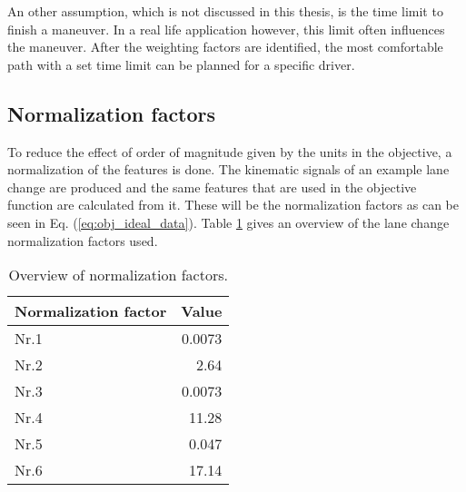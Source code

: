 An other assumption, which is not discussed in this thesis, is the time limit to finish a maneuver. In a real life application however, this limit often influences the maneuver. After the weighting factors are identified, the most comfortable path with a set time limit can be planned for a specific driver. 

\subsection{Normalization factors} \label{s:norm}
To reduce the effect of order of magnitude given by the units in the objective, a normalization of the features is done. The kinematic signals of an example lane change are produced and the same features that are used in the objective function are calculated from it. These will be the normalization factors as can be seen in Eq. (\ref{eq:obj_ideal_data}). Table \ref{table:norm} gives an overview of the lane change normalization factors used.  %


\begin{table}[h!]
  \centering
  \begin{tabular}{@{}lr@{}} 
    Normalization factor    & Value\\ \midrule
    Nr.1      & 0.0073\\
    Nr.2          & 2.64\\
    Nr.3 	   & 0.0073\\
    Nr.4       & 11.28\\
    Nr.5       & 0.047\\
    Nr.6  & 17.14\\ \bottomrule
  \end{tabular}
  \caption{Overview of  normalization factors.}
  \label{table:norm}
\end{table}

